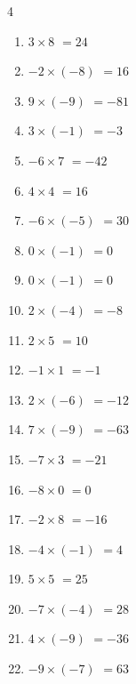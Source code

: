 \begin{multicols}{4}
\begin{enumerate}
  \item $3\times 8$
        $=24$

  \item $-2\times (-8)$
        $=16$

  \item $9\times (-9)$
        $=-81$

  \item $3\times (-1)$
        $=-3$

  \item $-6\times 7$
        $=-42$

  \item $4\times 4$
        $=16$

  \item $-6\times (-5)$
        $=30$

  \item $0\times (-1)$
        $=0$

\columnbreak %

  \item $0\times (-1)$
        $=0$

  \item $2\times (-4)$
        $=-8$

  \item $2\times 5$
        $=10$

  \item $-1\times 1$
        $=-1$

  \item $2\times (-6)$
        $=-12$

  \item $7\times (-9)$
        $=-63$

  \item $-7\times 3$
        $=-21$

  \item $-8\times 0$
        $=0$

  \item $-2\times 8$
        $=-16$

  \item $-4\times (-1)$
        $=4$

  \item $5\times 5$
        $=25$

  \item $-7\times (-4)$
        $=28$

  \item $4\times (-9)$
        $=-36$

  \item $-9\times (-7)$
        $=63$


\end{enumerate}
\end{multicols}
